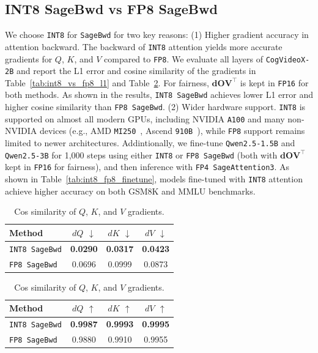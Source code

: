 \subsection{INT8 SageBwd vs FP8 SageBwd}
\label{sec:in8_vs_fp8_sagebwd}
We choose \texttt{INT8} for \texttt{SageBwd} for two key reasons: (1) Higher gradient accuracy in attention backward.
The backward of \texttt{INT8} attention yields more accurate gradients for $Q$, $K$, and $V$ compared to \texttt{FP8}.
We evaluate all layers of \texttt{CogVideoX-2B} and report the L1 error and cosine similarity of the gradients in Table~\ref{tab:int8_vs_fp8_l1} and Table~\ref{tab:int8_vs_fp8_cos}.
For fairness, $\mathbf{dOV}^\top$ is kept in \texttt{FP16} for both methods.
As shown in the results, \texttt{INT8 SageBwd} achieves lower L1 error and higher cosine similarity than \texttt{FP8 SageBwd}. (2) Wider hardware support.
\texttt{INT8} is supported on almost all modern GPUs, including NVIDIA \texttt{A100} and many non-NVIDIA devices (e.g., AMD \texttt{MI250}~\cite{amd-mi250-rocmdocs}, Ascend \texttt{910B}~\cite{liao2021ascend}), while \texttt{FP8} support remains limited to newer architectures.
Addintionally, we fine-tune \texttt{Qwen2.5-1.5B} and \texttt{Qwen2.5-3B} for 1,000 steps using either \texttt{INT8} or \texttt{FP8 SageBwd} (both with $\mathbf{dOV}^\top$ kept in \texttt{FP16} for fairness), and then inference with \texttt{FP4 SageAttention3}.
As shown in Table~\ref{tab:int8_fp8_finetune}, models fine-tuned with \texttt{INT8} attention achieve higher accuracy on both GSM8K and MMLU benchmarks.

\begin{table}[h]
\vspace{-.5em}
\centering
\small
\begin{minipage}{0.48\linewidth}
\centering
\caption{L1 error of $Q$, $K$, and $V$ gradients.}
\label{tab:int8_vs_fp8_l1}
\begin{tabular}{lccc}
\toprule
Method & $dQ$ $\downarrow$ & $dK$ $\downarrow$ & $dV$ $\downarrow$ \\
\midrule
\texttt{INT8 SageBwd} & \textbf{0.0290} & \textbf{0.0317} & \textbf{0.0423} \\
\texttt{FP8 SageBwd} & 0.0696 & 0.0999 & 0.0873 \\
\bottomrule
\end{tabular}
\end{minipage}
\hfill
\begin{minipage}{0.48\linewidth}
\centering
\caption{Cos similarity of $Q$, $K$, and $V$ gradients.}
\label{tab:int8_vs_fp8_cos}
\begin{tabular}{lccc}
\toprule
Method & $dQ$ $\uparrow$ & $dK$ $\uparrow$ & $dV$ $\uparrow$ \\
\midrule
\texttt{INT8 SageBwd} & \textbf{0.9987} & \textbf{0.9993} & \textbf{0.9995} \\
\texttt{FP8 SageBwd} & 0.9880 & 0.9910 & 0.9955 \\
\bottomrule
\end{tabular}
\end{minipage}
\vspace{-.5em}
\end{table}

